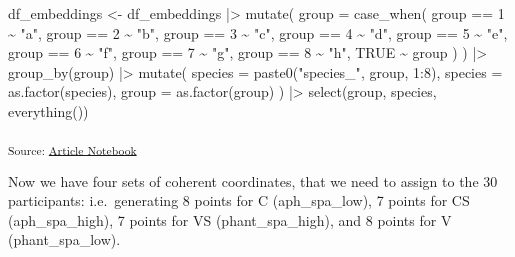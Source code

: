 \documentclass[
  authoryear]{elsarticle}
\newenvironment{Shaded}{\begin{snugshade}}{\end{snugshade}}
\newcommand{\AttributeTok}[1]{\textcolor[rgb]{0.40,0.45,0.13}{#1}}
\newcommand{\ConstantTok}[1]{\textcolor[rgb]{0.56,0.35,0.01}{#1}}
\newcommand{\DecValTok}[1]{\textcolor[rgb]{0.68,0.00,0.00}{#1}}
\newcommand{\FunctionTok}[1]{\textcolor[rgb]{0.28,0.35,0.67}{#1}}
\newcommand{\NormalTok}[1]{\textcolor[rgb]{0.00,0.23,0.31}{#1}}
\newcommand{\OtherTok}[1]{\textcolor[rgb]{0.00,0.23,0.31}{#1}}
\newcommand{\SpecialCharTok}[1]{\textcolor[rgb]{0.37,0.37,0.37}{#1}}
\newcommand{\StringTok}[1]{\textcolor[rgb]{0.13,0.47,0.30}{#1}}
\begin{document}
\begin{Shaded}
\begin{Highlighting}[]
\NormalTok{df\_embeddings }\OtherTok{\textless{}{-}} 
\NormalTok{  df\_embeddings }\SpecialCharTok{|\textgreater{}} 
  \FunctionTok{mutate}\NormalTok{(}
    \AttributeTok{group =} \FunctionTok{case\_when}\NormalTok{(}
\NormalTok{    group }\SpecialCharTok{==} \DecValTok{1} \SpecialCharTok{\textasciitilde{}} \StringTok{"a"}\NormalTok{, }
\NormalTok{    group }\SpecialCharTok{==} \DecValTok{2} \SpecialCharTok{\textasciitilde{}} \StringTok{"b"}\NormalTok{,}
\NormalTok{    group }\SpecialCharTok{==} \DecValTok{3} \SpecialCharTok{\textasciitilde{}} \StringTok{"c"}\NormalTok{,}
\NormalTok{    group }\SpecialCharTok{==} \DecValTok{4} \SpecialCharTok{\textasciitilde{}} \StringTok{"d"}\NormalTok{,}
\NormalTok{    group }\SpecialCharTok{==} \DecValTok{5} \SpecialCharTok{\textasciitilde{}} \StringTok{"e"}\NormalTok{,}
\NormalTok{    group }\SpecialCharTok{==} \DecValTok{6} \SpecialCharTok{\textasciitilde{}} \StringTok{"f"}\NormalTok{,}
\NormalTok{    group }\SpecialCharTok{==} \DecValTok{7} \SpecialCharTok{\textasciitilde{}} \StringTok{"g"}\NormalTok{,}
\NormalTok{    group }\SpecialCharTok{==} \DecValTok{8} \SpecialCharTok{\textasciitilde{}} \StringTok{"h"}\NormalTok{,}
    \ConstantTok{TRUE} \SpecialCharTok{\textasciitilde{}}\NormalTok{ group}
\NormalTok{    )}
\NormalTok{  ) }\SpecialCharTok{|\textgreater{}} 
  \FunctionTok{group\_by}\NormalTok{(group) }\SpecialCharTok{|\textgreater{}} 
  \FunctionTok{mutate}\NormalTok{(}
    \AttributeTok{species =} \FunctionTok{paste0}\NormalTok{(}\StringTok{"species\_"}\NormalTok{, group, }\DecValTok{1}\SpecialCharTok{:}\DecValTok{8}\NormalTok{),}
    \AttributeTok{species =} \FunctionTok{as.factor}\NormalTok{(species),}
    \AttributeTok{group   =} \FunctionTok{as.factor}\NormalTok{(group)}
\NormalTok{    ) }\SpecialCharTok{|\textgreater{}} 
  \FunctionTok{select}\NormalTok{(group, species, }\FunctionTok{everything}\NormalTok{())}
\end{Highlighting}
\end{Shaded}

\textsubscript{Source:
\href{https://m-delem.github.io/2499-similarity-manuscript/index.qmd.html}{Article
Notebook}}

Now we have four sets of coherent coordinates, that we need to assign to
the 30 participants: i.e.~generating 8 points for C (aph\_spa\_low), 7
points for CS (aph\_spa\_high), 7 points for VS (phant\_spa\_high), and
8 points for V (phant\_spa\_low).
\end{document}
